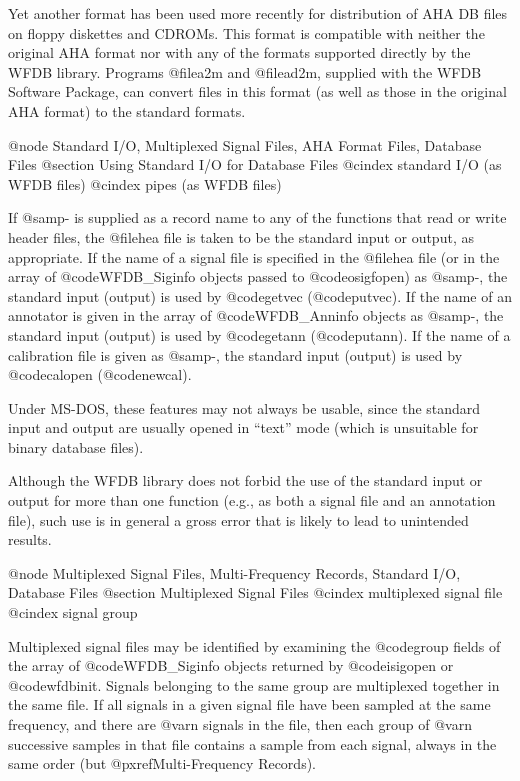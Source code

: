 {{{{{{{{{Yet another format has been used more recently for distribution of AHA DB files
on floppy diskettes and CDROMs.  This format is compatible with neither the
original AHA format nor with any of the formats supported directly by the WFDB
library.  Programs @file{a2m} and @file{ad2m}, supplied with the WFDB Software
Package, can convert files in this format (as well as those in the original AHA
format) to the standard formats.

@node Standard I/O, Multiplexed Signal Files, AHA Format Files, Database Files
@section Using Standard I/O for Database Files
@cindex standard I/O (as WFDB files)
@cindex pipes (as WFDB files)

If @samp{-} is supplied as a record name to any of the functions that
read or write header files, the @file{hea} file is taken to be
the standard input or output, as appropriate.  If the name of a signal
file is specified in the @file{hea} file (or in the array of
@code{WFDB_Siginfo} objects passed to @code{osigfopen}) as @samp{-}, the
standard input (output) is used by @code{getvec} (@code{putvec}).  If
the name of an annotator is given in the array of @code{WFDB_Anninfo} objects
as @samp{-}, the standard input (output) is used by @code{getann}
(@code{putann}).  If the name of a calibration file is given as
@samp{-}, the standard input (output) is used by @code{calopen}
(@code{newcal}).

Under MS-DOS, these features may not always be usable, since the
standard input and output are usually opened in ``text'' mode (which
is unsuitable for binary database files).

Although the WFDB library does not forbid the use of the standard
input or output for more than one function (e.g., as both a signal file
and an annotation file), such use is in general a gross error that is
likely to lead to unintended results.

@node     Multiplexed Signal Files, Multi-Frequency Records, Standard I/O, Database Files
@section Multiplexed Signal Files
@cindex multiplexed signal file
@cindex signal group

Multiplexed signal files may be identified by examining the @code{group}
fields of the array of @code{WFDB_Siginfo} objects returned by
@code{isigopen} or @code{wfdbinit}.  Signals belonging to the same group
are multiplexed together in the same file.  If all signals in a given signal
file have been sampled at the same frequency, and there are @var{n} signals
in the file, then each group of @var{n} successive samples in that file
contains a sample from each signal, always in the same order
(but @pxref{Multi-Frequency Records}).

}}}}}}}}}
